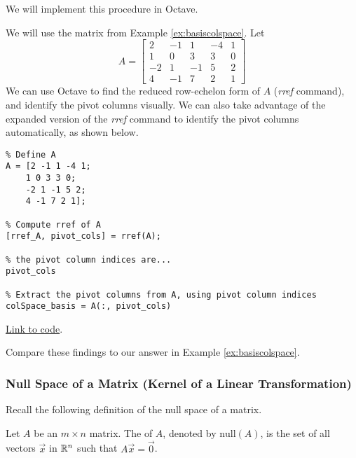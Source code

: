 \documentclass{ximera}
\begin{document}
We will implement this procedure in Octave.

\begin{template}\label{temp:colSpace}
We will use the matrix from Example \ref{ex:basiscolspace}.  Let $$A=\begin{bmatrix}2&-1&1&-4&1\\1&0&3&3&0\\-2&1&-1&5&2\\4&-1&7&2&1\end{bmatrix}$$
We can use Octave to find the reduced row-echelon form of $A$ (\emph{rref} command), and identify the pivot columns visually.  We can also take advantage of the expanded version of the \emph{rref} command to identify the pivot columns automatically, as shown below.

\begin{verbatim}
% Define A
A = [2 -1 1 -4 1;
    1 0 3 3 0;
    -2 1 -1 5 2;
    4 -1 7 2 1];

% Compute rref of A
[rref_A, pivot_cols] = rref(A);

% the pivot column indices are...
pivot_cols

% Extract the pivot columns from A, using pivot column indices
colSpace_basis = A(:, pivot_cols)
\end{verbatim}

\href{https://sagecell.sagemath.org/?z=eJxtTkEKwjAQvAfyh7kULNhiqiIoHoL6Ao9SSq2JBmxTklR8vhssKOjuZWeGmdkEe6VNpyA5k9jiVCATEMgWEBvOQCMww5x2NuKsiLrAEsXILCJcgfiSGM4S7GzbD0HBOaVhdUw_xbuSU_TmYUPV2LsvqTCyE5mOvnBTbx2kD20H011Mozxqp_I85-xjfhsOz-DqJvwYPbSzLahu8Ka7_g3ljPCxrxtVnWtvPH0jJ-vvB9MX3FlRVA==&lang=octave&interacts=eJyLjgUAARUAuQ==}{Link to code}.

Compare these findings to our answer in Example \ref{ex:basiscolspace}.
\end{template}  

\subsubsection*{Null Space of a Matrix (Kernel of a Linear Transformation)}

Recall the following definition of the null space of a matrix.
\begin{definition}[\ref{def:nullspace}] Let $A$ be an $m\times n$ matrix.  The  of $A$, denoted by $\mbox{null}(A)$, is the set of all vectors $\vec{x}$ in $\mathbb{R}^n$ such that $A\vec{x}=\vec{0}$.
\end{definition}
\end{document}
